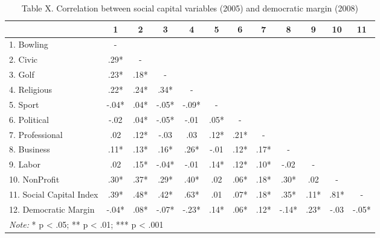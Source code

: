 \documentclass[
  english,
  man]{apa6}
\begin{document}
\begin{table}

\caption{\label{tab:regression}Table X. Correlation between social capital variables (2005) and democratic margin (2008)}
\centering
\begin{tabular}[t]{l|c|c|c|c|c|c|c|c|c|c|c}
\hline
  & 1 & 2 & 3 & 4 & 5 & 6 & 7 & 8 & 9 & 10 & 11\\
\hline
1. Bowling & - &  &  &  &  &  &  &  &  &  & \\
\hline
2. Civic & .29* & - &  &  &  &  &  &  &  &  & \\
\hline
3. Golf & .23* & .18* & - &  &  &  &  &  &  &  & \\
\hline
4. Religious & .22* & .24* & .34* & - &  &  &  &  &  &  & \\
\hline
5. Sport & -.04* & .04* & -.05* & -.09* & - &  &  &  &  &  & \\
\hline
6. Political & -.02 & .04* & -.05* & -.01 & .05* & - &  &  &  &  & \\
\hline
7. Professional & .02 & .12* & -.03 & .03 & .12* & .21* & - &  &  &  & \\
\hline
8. Business & .11* & .13* & .16* & .26* & -.01 & .12* & .17* & - &  &  & \\
\hline
9. Labor & .02 & .15* & -.04* & -.01 & .14* & .12* & .10* & -.02 & - &  & \\
\hline
10. NonProfit & .30* & .37* & .29* & .40* & .02 & .06* & .18* & .30* & .02 & - & \\
\hline
11. Social Capital Index & .39* & .48* & .42* & .63* & .01 & .07* & .18* & .35* & .11* & .81* & -\\
\hline
12. Democratic Margin & -.04* & .08* & -.07* & -.23* & .14* & .06* & .12* & -.14* & .23* & -.03 & -.05*\\
\hline
\multicolumn{12}{l}{\rule{0pt}{1em}\textit{Note: } * p < .05; ** p < .01; *** p < .001}\\
\end{tabular}
\end{table}
\end{document}
